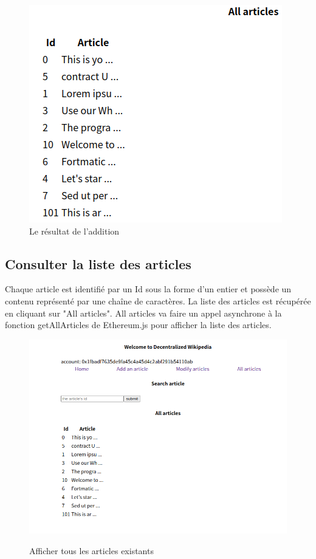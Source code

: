 \documentclass[14px]{article}
\begin{document}
\begin{figure}[H]
\begin{minipage}[H]{0.4\linewidth}
			\includegraphics[width=\textwidth]{Add03.png}
			\caption{Le résultat de l'addition}
			\label{img2}
		\end{minipage}
	\end{figure}
	
	\clearpage
    \pagestyle{fancy}
	\rhead{\thepage}
	\fancyfoot{}
	\subsection{Consulter la liste des articles}
	Chaque article est identifié par un Id sous la forme d'un entier et possède un contenu représenté par une chaîne de caractères.
	La liste des articles est récupérée en cliquant sur "All articles".  All articles va faire un appel asynchrone à la fonction  getAllArticles de Ethereum.js pour afficher la liste des articles.
	\begin{figure}[H]
		\begin{minipage}[H]{\linewidth}
			\centering
			\includegraphics[width=\textwidth]{Consulter01.png}\\
			\caption{Afficher tous les articles existants}
			\label{img1}
		\end{minipage}
	\end{figure}
	
\end{document}
